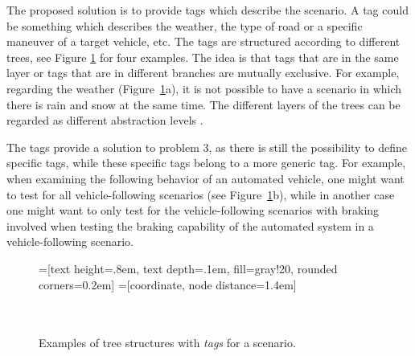 The proposed solution is to provide tags which describe the scenario. A tag could be something which describes the weather, the type of road or a specific maneuver of a target vehicle, etc. The tags are structured according to different trees, see Figure \ref{fig:tag trees} for four examples. The idea is that tags that are in the same layer or tags that are in different branches are mutually exclusive. For example, regarding the weather (Figure~\ref{fig:tag trees}a), it is not possible to have a scenario in which there is rain and snow at the same time. The different layers of the trees can be regarded as different abstraction levels \cite{Bonnin2014}. 

The tags provide a solution to problem 3, as there is still the possibility to define specific tags, while these specific tags belong to a more generic tag. For example, when examining the following behavior of an automated vehicle, one might want to test for all vehicle-following scenarios (see Figure~\ref{fig:tag trees}b), while in another case one might want to only test for the vehicle-following scenarios with braking involved when testing the braking capability of the automated system in a vehicle-following scenario.

\begin{figure}
	\begin{center}
		=[text height=.8em, text depth=.1em, fill=gray!20, rounded corners=0.2em]
		=[coordinate, node distance=1.4em]
		 \\
		\\
		 \\
		\caption{Examples of tree structures with \emph{tags} for a scenario.}
		\label{fig:tag trees}
	\end{center}
\end{figure}
